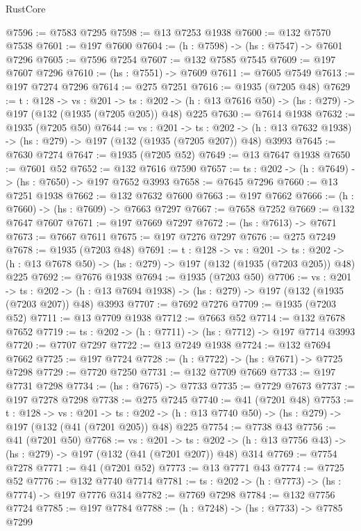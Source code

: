 \begin{lexlean}{RustCore}
\begin{coremodule}
@7596 := @7583 @7295
@7598 := @13 @7253 @1938
@7600 := @132 @7570 @7538
@7601 := @197 @7600
@7604 := (h : @7598) -> (hs : @7547) -> @7601 @7296
@7605 := @7596 @7254
@7607 := @132 @7585 @7545
@7609 := @197 @7607 @7296
@7610 := (hs : @7551) -> @7609
@7611 := @7605 @7549
@7613 := @197 @7274 @7296
@7614 := @275 @7251
@7616 := @1935 (@7205 @48)
@7629 := {t : @128} ->
  {vs : @201} ->
  {ts : @202} -> (h : @13 @7616 @50) -> (hs : @279) -> @197 (@132 (@1935 (@7205 @205)) @48) @225
@7630 := @7614 @1938
@7632 := @1935 (@7205 @50)
@7644 := {vs : @201} ->
  {ts : @202} -> (h : @13 @7632 @1938) -> (hs : @279) -> @197 (@132 (@1935 (@7205 @207)) @48) @3993
@7645 := @7630 @7274
@7647 := @1935 (@7205 @52)
@7649 := @13 @7647 @1938
@7650 := @7601 @52
@7652 := @132 @7616 @7590
@7657 := {ts : @202} -> (h : @7649) -> (hs : @7650) -> @197 @7652 @3993
@7658 := @7645 @7296
@7660 := @13 @7251 @1938
@7662 := @132 @7632 @7600
@7663 := @197 @7662
@7666 := (h : @7660) -> (hs : @7609) -> @7663 @7297
@7667 := @7658 @7252
@7669 := @132 @7647 @7607
@7671 := @197 @7669 @7297
@7672 := (hs : @7613) -> @7671
@7673 := @7667 @7611
@7675 := @197 @7276 @7297
@7676 := @275 @7249
@7678 := @1935 (@7203 @48)
@7691 := {t : @128} ->
  {vs : @201} ->
  {ts : @202} -> (h : @13 @7678 @50) -> (hs : @279) -> @197 (@132 (@1935 (@7203 @205)) @48) @225
@7692 := @7676 @1938
@7694 := @1935 (@7203 @50)
@7706 := {vs : @201} ->
  {ts : @202} -> (h : @13 @7694 @1938) -> (hs : @279) -> @197 (@132 (@1935 (@7203 @207)) @48) @3993
@7707 := @7692 @7276
@7709 := @1935 (@7203 @52)
@7711 := @13 @7709 @1938
@7712 := @7663 @52
@7714 := @132 @7678 @7652
@7719 := {ts : @202} -> (h : @7711) -> (hs : @7712) -> @197 @7714 @3993
@7720 := @7707 @7297
@7722 := @13 @7249 @1938
@7724 := @132 @7694 @7662
@7725 := @197 @7724
@7728 := (h : @7722) -> (hs : @7671) -> @7725 @7298
@7729 := @7720 @7250
@7731 := @132 @7709 @7669
@7733 := @197 @7731 @7298
@7734 := (hs : @7675) -> @7733
@7735 := @7729 @7673
@7737 := @197 @7278 @7298
@7738 := @275 @7245
@7740 := @41 (@7201 @48)
@7753 := {t : @128} ->
  {vs : @201} ->
  {ts : @202} -> (h : @13 @7740 @50) -> (hs : @279) -> @197 (@132 (@41 (@7201 @205)) @48) @225
@7754 := @7738 @43
@7756 := @41 (@7201 @50)
@7768 := {vs : @201} ->
  {ts : @202} -> (h : @13 @7756 @43) -> (hs : @279) -> @197 (@132 (@41 (@7201 @207)) @48) @314
@7769 := @7754 @7278
@7771 := @41 (@7201 @52)
@7773 := @13 @7771 @43
@7774 := @7725 @52
@7776 := @132 @7740 @7714
@7781 := {ts : @202} -> (h : @7773) -> (hs : @7774) -> @197 @7776 @314
@7782 := @7769 @7298
@7784 := @132 @7756 @7724
@7785 := @197 @7784
@7788 := (h : @7248) -> (hs : @7733) -> @7785 @7299

\end{coremodule}
\end{lexlean}
